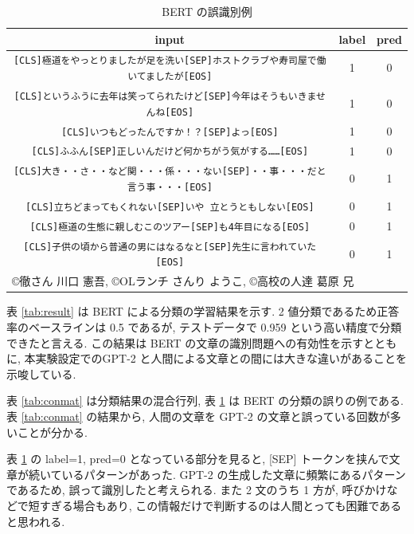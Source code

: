 \documentclass[twocolumn]{jarticle}     %
\begin{document}
\begin{table}[tb]
  \begin{center}
    \caption{BERT の誤識別例}
    \begin{tabular}{ccc}
      \hline
      input & label & pred \\
      \hline
      \verb|[CLS]極道をやっとりましたが足を洗い[SEP]ホストクラブや寿司屋で働いてましたが[EOS]| & 1 & 0 \\
      \verb|[CLS]というふうに去年は笑ってられたけど[SEP]今年はそうもいきませんね[EOS]| & 1 & 0 \\
      \verb|[CLS]いつもどったんですか！？[SEP]よっ[EOS]| & 1 & 0 \\
      \verb|[CLS]ふふん[SEP]正しいんだけど何かちがう気がする……[EOS]| & 1 & 0 \\
      \verb|[CLS]大き・・さ・・など関・・・係・・・ない[SEP]・・事・・・だと言う事・・・[EOS]| & 0 & 1 \\
      \verb|[CLS]立ちどまってもくれない[SEP]いや 立とうともしない[EOS]| & 0 & 1 \\
      \verb|[CLS]極道の生態に親しむこのツアー[SEP]も4年目になる[EOS]| & 0 & 1 \\
      \verb|[CLS]子供の頃から普通の男にはなるなと[SEP]先生に言われていた[EOS]| & 0 & 1 \\
      \hline
      \multicolumn{3}{l}{©徹さん	川口 憲吾,   ©OLランチ	さんり ようこ,  ©高校の人達	葛原 兄}
    \end{tabular}
    \label{tab:bert_result}
  \end{center}
\end{table}

表 \ref{tab:result} は BERT による分類の学習結果を示す.
2 値分類であるため正答率のベースラインは 0.5 であるが, テストデータで 0.959 という高い精度で分類できたと言える.
この結果は BERT の文章の識別問題への有効性を示すとともに, 本実験設定でのGPT-2 と人間による文章との間には大きな違いがあることを示唆している.



表 \ref{tab:conmat} は分類結果の混合行列,
表 \ref{tab:bert_result} は BERT の分類の誤りの例である.
表 \ref{tab:conmat} の結果から, 人間の文章を GPT-2 の文章と誤っている回数が多いことが分かる.

表 \ref{tab:bert_result} の label=1, pred=0 となっている部分を見ると,
[SEP] トークンを挟んで文章が続いているパターンがあった.
GPT-2 の生成した文章に頻繁にあるパターンであるため, 誤って識別したと考えられる.
また 2 文のうち 1 方が, 呼びかけなどで短すぎる場合もあり, この情報だけで判断するのは人間とっても困難であると思われる.
\end{document}
